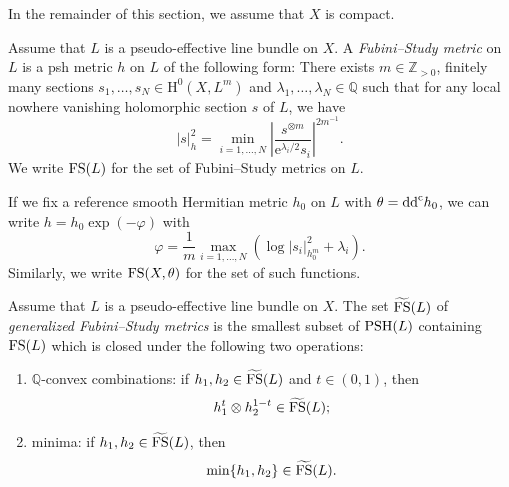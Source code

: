 In the remainder of this section, we assume that $X$ is compact.

\begin{definition}\label{def:ArcFSmetric}Assume that $L$ is a pseudo-effective line bundle on $X$.
    A \emph{Fubini--Study metric} on $L$ is a psh metric $h$ on $L$ of the following form: There exists $m\in \mathbb{Z}_{>0}$, finitely many sections $s_1,\ldots,s_N\in \mathrm{H}^0(X,L^m)$ and $\lambda_1,\ldots,\lambda_N\in \mathbb{Q}$ such that for any local nowhere vanishing holomorphic section $s$ of $L$, we have
    \[
    |s|_h^2=\min_{i=1,\ldots,N}\left| \frac{s^{\otimes m}}{\mathrm{e}^{\lambda_i/2}s_i}\right|^{2m^{-1}}.
    \]
    We write $\mathrm{FS}(L)$ for the set of Fubini--Study metrics on $L$.
\end{definition}
If we fix a reference smooth Hermitian metric $h_0$ on $L$ with $\theta=\mathrm{dd}^{\mathrm{c}} h_0$, we can write $h=h_0\exp(-\varphi)$ with
\[
\varphi=\frac{1}{m}\max_{i=1,\ldots,N}\left(\log |s_i|^2_{h_0^{m}}+\lambda_i\right).
\]
Similarly, we write $\mathrm{FS}(X,\theta)$ for the set of such functions.

\begin{definition}\label{def:gFSmetric}
Assume that $L$ is a pseudo-effective line bundle on $X$.
    The set $\widetilde{\mathrm{FS}}(L)$ of \emph{generalized Fubini--Study metrics} is the smallest subset of $\mathrm{PSH}(L)$ containing $\mathrm{FS}(L)$ which is closed under the following two operations:
    \begin{enumerate}
        \item\label{itm:def:gFSmetric:1} $\mathbb{Q}$-convex combinations: if $h_1,h_2\in \widetilde{\mathrm{FS}}(L)$ and $t\in (0,1)$, then
        \[
        h_1^t \otimes h_2^{1-t}\in \widetilde{\mathrm{FS}}(L);
        \]
        \item\label{itm:def:gFSmetric:2} minima: if $h_1,h_2\in \widetilde{\mathrm{FS}}(L)$, then
        \[
        \min\{h_1,h_2\}\in \widetilde{\mathrm{FS}}(L).
        \]
    \end{enumerate}
\end{definition}


